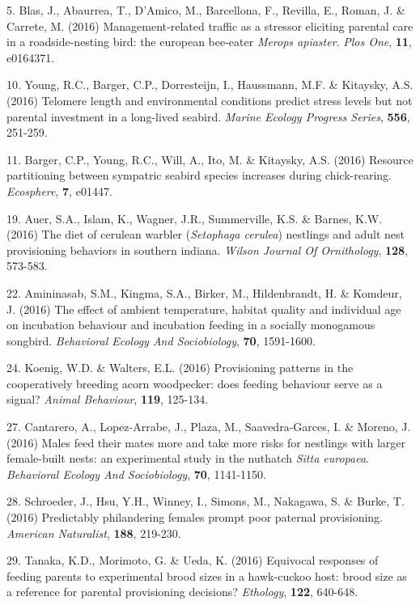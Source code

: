 5. Blas, J., Abaurrea, T., D'Amico, M., Barcellona, F., Revilla, E., Roman, J. \&  Carrete, M. (2016) Management-related traffic as a stressor eliciting parental care in a roadside-nesting bird: the european bee-eater \textit{Merops apiaster}. \textit{Plos One},  \textbf{11}, e0164371.

10. Young, R.C., Barger, C.P., Dorresteijn, I., Haussmann, M.F. \&  Kitaysky, A.S. (2016) Telomere length and environmental conditions predict stress levels but not parental investment in a long-lived seabird. \textit{Marine Ecology Progress Series},  \textbf{556}, 251-259.

11. Barger, C.P., Young, R.C., Will, A., Ito, M. \&  Kitaysky, A.S. (2016) Resource partitioning between sympatric seabird species increases during chick-rearing. \textit{Ecosphere},  \textbf{7}, e01447.

19. Auer, S.A., Islam, K., Wagner, J.R., Summerville, K.S. \&  Barnes, K.W. (2016) The diet of cerulean warbler (\textit{Setophaga cerulea}) nestlings and adult nest provisioning behaviors in southern indiana. \textit{Wilson Journal Of Ornithology},  \textbf{128}, 573-583.

22. Amininasab, S.M., Kingma, S.A., Birker, M., Hildenbrandt, H. \&  Komdeur, J. (2016) The effect of ambient temperature, habitat quality and individual age on incubation behaviour and incubation feeding in a socially monogamous songbird. \textit{Behavioral Ecology And Sociobiology},  \textbf{70}, 1591-1600.

24. Koenig, W.D. \&  Walters, E.L. (2016) Provisioning patterns in the cooperatively breeding acorn woodpecker: does feeding behaviour serve as a signal? \textit{Animal Behaviour},  \textbf{119}, 125-134.

27. Cantarero, A., Lopez-Arrabe, J., Plaza, M., Saavedra-Garces, I. \&  Moreno, J. (2016) Males feed their mates more and take more risks for nestlings with larger female-built nests: an experimental study in the nuthatch \textit{Sitta europaea}. \textit{Behavioral Ecology And Sociobiology},  \textbf{70}, 1141-1150.

28. Schroeder, J., Hsu, Y.H., Winney, I., Simons, M., Nakagawa, S. \&  Burke, T. (2016) Predictably philandering females prompt poor paternal provisioning. \textit{American Naturalist},  \textbf{188}, 219-230.

29. Tanaka, K.D., Morimoto, G. \&  Ueda, K. (2016) Equivocal responses of feeding parents to experimental brood sizes in a hawk-cuckoo host: brood size as a reference for parental provisioning decisions? \textit{Ethology},  \textbf{122}, 640-648.

